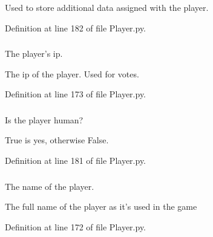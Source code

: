 Used to store additional data assigned with the player. 

Definition at line 182 of file Player.py.

\hypertarget{class_player_1_1_player_a48ed10bfc12677f9c41e2cae6daafa49}{
\subsubsection[{ip}]{}}
\label{class_player_1_1_player_a48ed10bfc12677f9c41e2cae6daafa49}


The player's ip. 

The ip of the player. Used for votes. 

Definition at line 173 of file Player.py.

\hypertarget{class_player_1_1_player_a01b505c0fe5ff3d20d75327800b1552e}{
\subsubsection[{is\_\-human}]{}}
\label{class_player_1_1_player_a01b505c0fe5ff3d20d75327800b1552e}


Is the player human? 

True is yes, otherwise False. 

Definition at line 181 of file Player.py.

\hypertarget{class_player_1_1_player_a6cea7416f6b4ce563211f3194033f671}{
\subsubsection[{name}]{}}
\label{class_player_1_1_player_a6cea7416f6b4ce563211f3194033f671}


The name of the player. 

The full name of the player as it's used in the game 

Definition at line 172 of file Player.py.

\hypertarget{class_player_1_1_player_ab675ec89c8e17a56d85f0304f46465ea}{
\subsubsection[{ping}]{}}
\label{class_player_1_1_player_ab675ec89c8e17a56d85f0304f46465ea}


